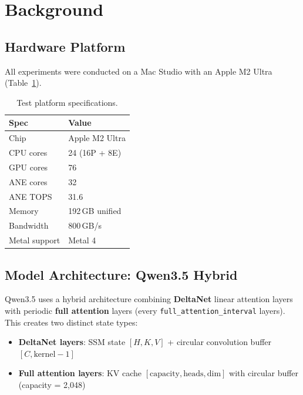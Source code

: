 \documentclass[11pt]{article}
\begin{document}
\section{Background}
\label{sec:background}

\subsection{Hardware Platform}

All experiments were conducted on a Mac Studio with an Apple M2 Ultra
(Table~\ref{tab:hardware}).

\begin{table}[h]
\centering
\caption{Test platform specifications.}
\label{tab:hardware}
\begin{tabular}{ll}
\toprule
Spec & Value \\
\midrule
Chip           & Apple M2 Ultra \\
CPU cores      & 24 (16P + 8E) \\
GPU cores      & 76 \\
ANE cores      & 32 \\
ANE TOPS       & 31.6 \\
Memory         & 192\,GB unified \\
Bandwidth      & 800\,GB/s \\
Metal support  & Metal 4 \\
\bottomrule
\end{tabular}
\end{table}

\subsection{Model Architecture: Qwen3.5 Hybrid}

Qwen3.5 uses a hybrid architecture combining \textbf{DeltaNet} linear
attention layers with periodic \textbf{full attention} layers (every
\texttt{full\_attention\_interval} layers). This creates two distinct
state types:

\begin{itemize}[nosep]
  \item \textbf{DeltaNet layers}: SSM state $[H, K, V]$ + circular
        convolution buffer $[C, \text{kernel}-1]$
  \item \textbf{Full attention layers}: KV cache
        $[\text{capacity}, \text{heads}, \text{dim}]$ with circular
        buffer (capacity = 2{,}048)
\end{itemize}
\end{document}
